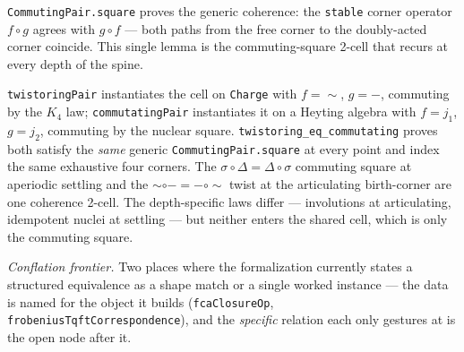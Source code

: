 \begin{theorem}\label{thm:commuting-square}\leanok{}
\texttt{CommutingPair.square} proves the generic coherence: the \texttt{stable} corner operator $f \circ g$ agrees with $g \circ f$ --- both paths from the free corner to the doubly-acted corner coincide. This single lemma is the commuting-square 2-cell that recurs at every depth of the spine.
\end{theorem}
\begin{definition}\label{thm:twistoring-eq-commutating}\leanok{}
\texttt{twistoringPair} instantiates the cell on \texttt{Charge} with $f = {\sim}$, $g = {-}$, commuting by the $K_4$ law; \texttt{commutatingPair} instantiates it on a Heyting algebra with $f = j_1$, $g = j_2$, commuting by the nuclear square. \texttt{twistoring\_eq\_commutating} proves both satisfy the \emph{same} generic \texttt{CommutingPair.square} at every point and index the same exhaustive four corners. The $\sigma\circ\Delta = \Delta\circ\sigma$ commuting square at aperiodic settling and the ${\sim}\circ{-} = {-}\circ{\sim}$ twist at the articulating birth-corner are one coherence 2-cell. The depth-specific laws differ --- involutions at articulating, idempotent nuclei at settling --- but neither enters the shared cell, which is only the commuting square.
\end{definition}

\noindent\emph{Conflation frontier.} Two places where the formalization currently states a structured equivalence as a shape match or a single worked instance --- the data is named for the object it builds (\texttt{fcaClosureOp}, \texttt{frobeniusTqftCorrespondence}), and the \emph{specific} relation each only gestures at is the open node after it.

